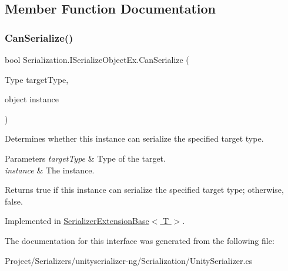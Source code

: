 \subsection{Member Function Documentation}
\mbox{\label{interface_serialization_1_1_i_serialize_object_ex_a5a13bf50bde25dc6b1f593da8cb5eb06}} 
\subsubsection{\texorpdfstring{Can\+Serialize()}{CanSerialize()}}
{\footnotesize\ttfamily bool Serialization.\+I\+Serialize\+Object\+Ex.\+Can\+Serialize (\begin{DoxyParamCaption}\item[{Type}]{target\+Type,  }\item[{object}]{instance }\end{DoxyParamCaption})}



Determines whether this instance can serialize the specified target type. 


\begin{DoxyParams}{Parameters}
{\em target\+Type} & Type of the target.\\
\hline
{\em instance} & The instance.\\
\hline
\end{DoxyParams}
\begin{DoxyReturn}{Returns}
{\ttfamily true} if this instance can serialize the specified target type; otherwise, {\ttfamily false}.
\end{DoxyReturn}


Implemented in \hyperlink{class_serializer_extension_base_af730b106e15a036d8099ebf63d6df543}{Serializer\+Extension\+Base$<$ T $>$}.



The documentation for this interface was generated from the following file\+:\begin{DoxyCompactItemize}
\item 
Project/\+Serializers/unityserializer-\/ng/\+Serialization/Unity\+Serializer.\+cs\end{DoxyCompactItemize}
